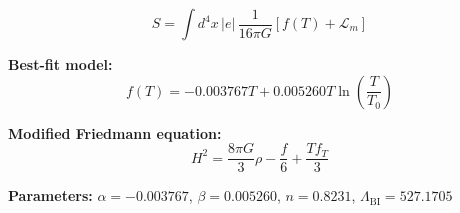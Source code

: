 
\begin{equation}
  S = \int d^4x \, |e| \, \frac{1}{16\pi G} \left[ f(T) + \mathcal{L}_m \right]
\end{equation}

\textbf{Best-fit model:}
\begin{equation}
  f(T) = -0.003767 T + 0.005260 T \ln\!\left(\frac{T}{T_0}\right)
\end{equation}

\textbf{Modified Friedmann equation:}
\begin{equation}
  H^2 = \frac{8\pi G}{3} \rho - \frac{f}{6} + \frac{T f_T}{3}
\end{equation}

\textbf{Parameters:}
$\alpha = -0.003767$, \quad
$\beta = 0.005260$, \quad
$n = 0.8231$, \quad
$\Lambda_{\text{BI}} = 527.1705$
